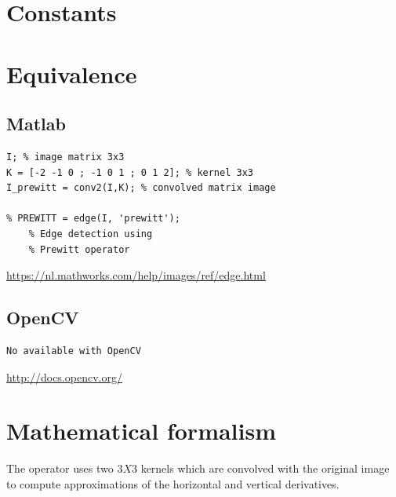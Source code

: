 \documentclass[12pt,a4paper]{article}
\begin{document}
\vspace{0.5cm}

\section*{Constants}


\newpage

\section*{Equivalence}
\subsection*{Matlab}

\lstset{language=Matlab}
\begin{lstlisting}
I; % image matrix 3x3
K = [-2 -1 0 ; -1 0 1 ; 0 1 2]; % kernel 3x3
I_prewitt = conv2(I,K); % convolved matrix image 

% PREWITT = edge(I, 'prewitt'); 
	% Edge detection using 
	% Prewitt operator

\end{lstlisting}

\url{https://nl.mathworks.com/help/images/ref/edge.html}


\subsection*{OpenCV}

\lstset{language=C++}
\begin{lstlisting}
No available with OpenCV
\end{lstlisting}

\url{http://docs.opencv.org/}

\section*{Mathematical formalism}

The operator uses two $3X3$ kernels which are convolved with the original image to compute approximations of the horizontal and vertical derivatives. \\
\end{document}
